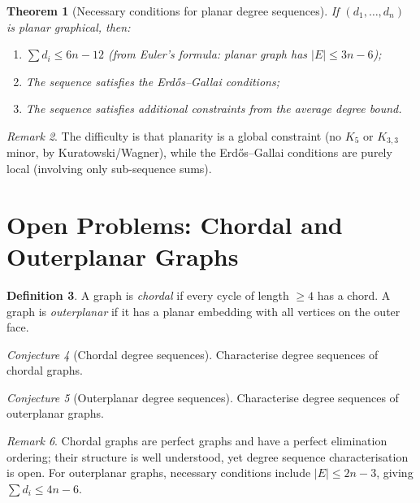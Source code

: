 \documentclass[12pt,a4paper]{amsart}
\newtheorem{theorem}{Theorem}[section]
\theoremstyle{definition}
\newtheorem{definition}[theorem]{Definition}
\theoremstyle{remark}
\newtheorem{remark}[theorem]{Remark}
\newtheorem{conjecture}[theorem]{Conjecture}
\begin{document}
\begin{theorem}[Necessary conditions for planar degree sequences]
If $(d_1, \ldots, d_n)$ is planar graphical, then:
\begin{enumerate}[label=(\roman*)]
  \item $\sum d_i \leq 6n - 12$ (from Euler's formula: planar graph has
        $|E| \leq 3n-6$);
  \item The sequence satisfies the Erd\H{o}s--Gallai conditions;
  \item The sequence satisfies additional constraints from the average degree
        bound.
\end{enumerate}
\end{theorem}

\begin{remark}
The difficulty is that planarity is a global constraint (no $K_5$ or $K_{3,3}$
minor, by Kuratowski/Wagner), while the Erd\H{o}s--Gallai conditions are
purely local (involving only sub-sequence sums).
\end{remark}

\section{Open Problems: Chordal and Outerplanar Graphs}

\begin{definition}
A graph is \emph{chordal} if every cycle of length $\geq 4$ has a chord.
A graph is \emph{outerplanar} if it has a planar embedding with all vertices
on the outer face.
\end{definition}

\begin{conjecture}[Chordal degree sequences]
\label{conj:chordal}
Characterise degree sequences of chordal graphs.
\end{conjecture}

\begin{conjecture}[Outerplanar degree sequences]
\label{conj:outerplanar}
Characterise degree sequences of outerplanar graphs.
\end{conjecture}

\begin{remark}
Chordal graphs are perfect graphs and have a perfect elimination ordering;
their structure is well understood, yet degree sequence characterisation is open.
For outerplanar graphs, necessary conditions include $|E| \leq 2n-3$, giving
$\sum d_i \leq 4n - 6$.
\end{remark}
\end{document}
